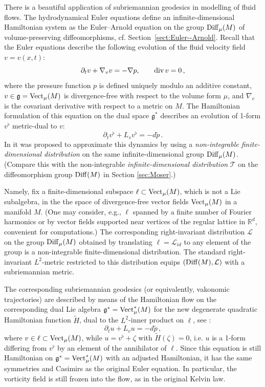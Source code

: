 \documentclass[11pt]{article}
\theoremstyle{definition}
\newcounter{ai}
\begin{document}
There is a beautiful application of subriemannian geodesics in modelling of fluid flows.
The hydrodynamical Euler equations define an infinite-dimensional Hamiltonian system as the Euler--Arnold equation on the group 
${\rm Diff}_\mu(M)$ of volume-preserving diffeomorphisms, cf. Section~\ref{sect:Euler--Arnold}.
Recall that the Euler equations describe the following evolution of the fluid velocity field $v=v(x,t)$:
$$
\partial_t v +\nabla_v v=-\nabla p, \qquad {\rm div}\,v=0\,,
$$
where the pressure function $p$ is defined uniquely modulo an additive constant, $v\in \mathfrak g={\rm Vect}_\mu(M)$ is divergence-free with respect to the volume form $\mu$, and $\nabla_v$ is the covariant derivative with respect to a metric on $M$. 
The Hamiltonian formulation of this equation on the dual space $\mathfrak g^*$ describes 
an evolution of 1-form $v^\flat$ metric-dual to $v$:
$$
\partial_t v^\flat +L_v v^\flat=-d\tilde p\,.
$$
In \cite{Sina, Chern2024} it was proposed to approximate this dynamics by using a {\it non-integrable finite-dimensional distribution} on the same infinite-dimensional group ${\rm Diff}_\mu(M)$. 
(Compare this with the non-integrable  {\it infinite-dimensional distribution} $\mathcal T$ on the diffeomorphism group ${\rm Diff}(M)$ in Section \ref{sec:Moser}.)

Namely, fix a finite-dimensional subspace $\ell\subset {\rm Vect}_\mu(M)$, 
which is not a Lie subalgebra, in the the space of divergence-free vector fields $ {\rm Vect}_\mu(M)$ in a manifold $M$. 
(One may consider, e.g., $\ell$ spanned by a finite number of Fourier harmonics or by vector fields supported near vertices of the regular lattice in $\mathbb R^d$, convenient for computations.) The corresponding right-invariant distribution $\mathcal L$  on the group ${\rm Diff}_\mu(M)$ 
obtained by translating $\ell=\mathcal L_{id}$  to any element of the group is a non-integrable finite-dimensional distribution.
The standard right-invariant $L^2$-metric restricted to this distribution equips $({\rm Diff}(M), \mathcal L)$ with a subriemannian metric.
 
The corresponding subriemannian geodesics (or equivalently, vakonomic trajectories) are described by means of the Hamiltonian flow on the corresponding  dual Lie algebra $\mathfrak g^*= {\rm Vect}^*_\mu(M)$ for the new degenerate quadratic Hamiltonian function $\tilde H$, dual to the $L^2$-inner product on $\ell$, see \cite{Sina}:
$$
\partial_t u +L_v u=-d\tilde p\,,
$$
where  $v\in \ell\subset {\rm Vect}_\mu(M)$, while $u=v^\flat+\zeta$ with $\tilde H(\zeta)=0$, i.e. $u$
is a 1-form differing from $v^\flat$ by an element of the annihilator of $\ell$.
Since this equation is still Hamiltonian on $\mathfrak g^*= {\rm Vect}^*_\mu(M)$ with an adjusted Hamiltonian, it has the same symmetries and Casimirs as the original Euler equation. In particular, the vorticity field is still frozen into the flow, as in the original Kelvin law.
\smallskip
\end{document}
